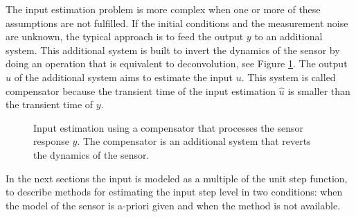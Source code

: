 The input estimation problem is more complex when one or more of these assumptions are not fulfilled.
If the initial conditions and the measurement noise are unknown, the typical approach is to feed the output ${y}$ to an additional system.
This additional system is built to invert the dynamics of the sensor by doing an operation that is equivalent to deconvolution, see Figure \ref{fig:compensator}.
The output $\widehat{{u}}$ of the additional system aims to estimate the input ${u}$.
This system is called compensator because the transient time of the input estimation $\widehat{{u}}$ is smaller than the transient time of ${y}$.  

\begin{figure}[htb!]
\centering
{}
 \caption{Input estimation using a compensator that processes the sensor response ${y}$. The compensator is an additional system that reverts the dynamics of the sensor.} \label{fig:compensator}
 \end{figure}

In the next sections the input is modeled as a multiple of the unit step function, to describe methods for estimating the input step level in two conditions: when the model of the sensor is a-priori given and when the method is not available. 

